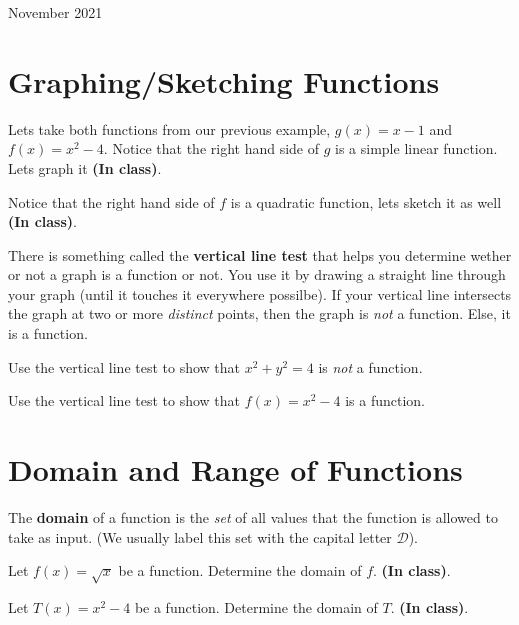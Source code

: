 \documentclass[12pt,oneside]{book} %
\begin{document}
\begin{lec}{November 2021}
	\section{Graphing/Sketching Functions}
	Lets take both functions from our previous example, $g(x) = x - 1$ and $f(x) = x^2 -  4$. Notice that the right hand side of
	$g$ is a simple linear function. Lets graph it \textbf{(In class)}.

	Notice that the right hand side of $f$ is a quadratic function, lets sketch it as well \textbf{(In class)}.

  \begin{rem}
      There is something called the \textbf{vertical line test} that helps you determine wether or not a graph is a function or
      not. You use it by drawing a straight line through your graph (until it touches it everywhere possilbe). If your vertical
      line intersects the graph at two or more \emph{distinct} points, then the graph is \emph{not} a function. Else, it is a
      function.
  \end{rem}

  \begin{ex}
    Use the vertical line test to show that $x^2 + y^2 = 4$ is \emph{not} a function.
  \end{ex}

  \begin{ex}
    Use the vertical line test to show that $f(x) = x^2 - 4$ is a function.
  \end{ex}

  \section{Domain and Range of Functions}
  \begin{mdframed}
    \begin{defn}
      The \textbf{domain} of a function is the \emph{set} of all values that the function is allowed to take as input. (We usually label
      this set with the capital letter $\mathcal{D}$).
    \end{defn}
  \end{mdframed}
  \begin{ex}
    Let $f(x) = \sqrt{x}$ be a function. Determine the domain of $f$. \textbf{(In class)}.
  \end{ex}
  \begin{ex}
    Let $T(x) = x^2 - 4$ be a function. Determine the domain of $T$. \textbf{(In class)}.
  \end{ex}


\end{lec}
\end{document}

